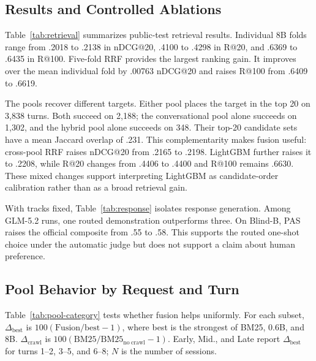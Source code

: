 \subsection{Results and Controlled Ablations}

Table~\ref{tab:retrieval} summarizes public-test retrieval results. Individual 8B folds
range from .2018 to .2138 in nDCG@20, .4100 to .4298 in R@20, and .6369 to
.6435 in R@100. Five-fold RRF provides the largest ranking gain. It improves
over the mean individual fold by .00763 nDCG@20 and raises R@100 from .6409 to
.6619.

The pools recover different targets. Either pool places the target in the top
20 on 3,838 turns. Both succeed on 2,188; the conversational pool alone
succeeds on 1,302, and the hybrid pool alone succeeds on 348. Their top-20
candidate sets have a mean Jaccard overlap of .231. This complementarity makes
fusion useful: cross-pool RRF raises nDCG@20 from .2165 to .2198. LightGBM
further raises it to .2208, while R@20 changes from .4406 to .4400 and R@100
remains .6630. These mixed changes support interpreting LightGBM as
candidate-order calibration rather than as a broad retrieval gain.

With tracks fixed, Table~\ref{tab:response} isolates response generation. Among
GLM-5.2 runs, one routed demonstration outperforms three. On Blind-B, PAS raises the
official composite from .55 to .58. This supports the routed one-shot choice
under the automatic judge but does not support a claim about human preference.

\subsection{Pool Behavior by Request and Turn}

Table~\ref{tab:pool-category} tests whether fusion helps uniformly. For each
subset, $\Delta_{\mathrm{best}}$ is $100(\mathrm{Fusion}/\mathrm{best}-1)$, where
best is the strongest of BM25, 0.6B, and 8B. $\Delta_{\mathrm{crawl}}$ is
$100(\mathrm{BM25}/\mathrm{BM25}_{\mathrm{no\ crawl}}-1)$. Early, Mid., and
Late report $\Delta_{\mathrm{best}}$ for turns 1--2, 3--5, and 6--8; $N$ is
the number of sessions.

